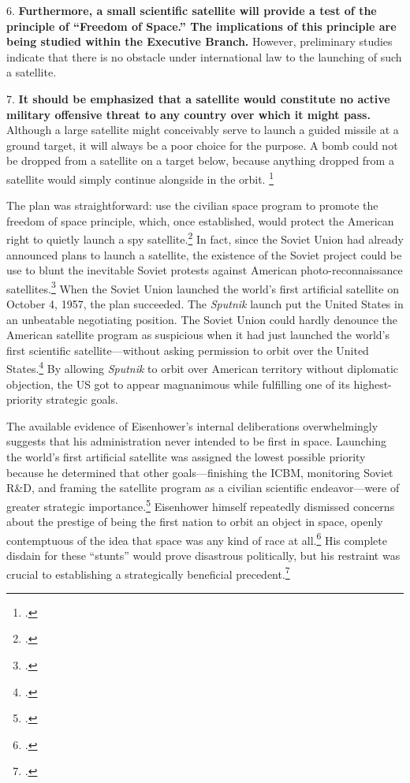 \documentclass[14pt]{extarticle}
\begin{document}
\begin{quoteblock}
6. \textelp{} \textbf{Furthermore, a small scientific satellite will provide a test of the principle of “Freedom of Space.” The implications of this principle are being studied within the Executive Branch.} However, preliminary studies indicate that there is no obstacle under international law to the launching of such a satellite.

7. \textbf{It should be emphasized that a satellite would constitute no active military offensive threat to any country over which it might pass.} Although a large satellite might conceivably serve to launch a guided missile at a ground target, it will always be a poor choice for the purpose. A bomb could not be dropped from a satellite on a target below, because anything dropped from a satellite would simply continue alongside in the orbit. \footcite{nsc_planning_board_draft_1955}
\newline
\end{quoteblock}

The plan was straightforward: use the civilian space program to promote the freedom of space principle, which, once established, would protect the American right to quietly launch a spy satellite.\footcite[p.~119]{day_eye_2015} In fact, since the Soviet Union had already announced plans to launch a satellite, the existence of the Soviet project could be use to blunt the inevitable Soviet protests against American photo-reconnaissance satellites.\footcite[p.~120]{mcdougall_heavens_1985} When the Soviet Union launched the world's first artificial satellite on October 4, 1957, the plan succeeded. The \emph{Sputnik} launch put the United States in an unbeatable negotiating position. The Soviet Union could hardly denounce the American satellite program as suspicious when it had just launched the world's first scientific satellite---without asking permission to orbit over the United States.\footcite[p.~40]{peebles_corona_1997} By allowing \emph{Sputnik} to orbit over American territory without diplomatic objection, the US got to appear magnanimous while fulfilling one of its highest-priority strategic goals.

The available evidence of Eisenhower's internal deliberations overwhelmingly suggests that his administration never intended to be first in space. Launching the world's first artificial satellite was assigned the lowest possible priority because he determined that other goals---finishing the ICBM, monitoring Soviet R\&D, and framing the satellite program as a civilian scientific endeavor---were of greater strategic importance.\footcite[p.~123-124]{mcdougall_heavens_1985} Eisenhower himself repeatedly dismissed concerns about the prestige of being the first nation to orbit an object in space, openly contemptuous of the idea that space was any kind of race at all.\footcite[p.~100]{lindgren_trust_2000} His complete disdain for these ``stunts'' would prove disastrous politically, but his restraint was crucial to establishing a strategically beneficial precedent.\footcite[p.~134]{day_eye_2015}
\end{document}
